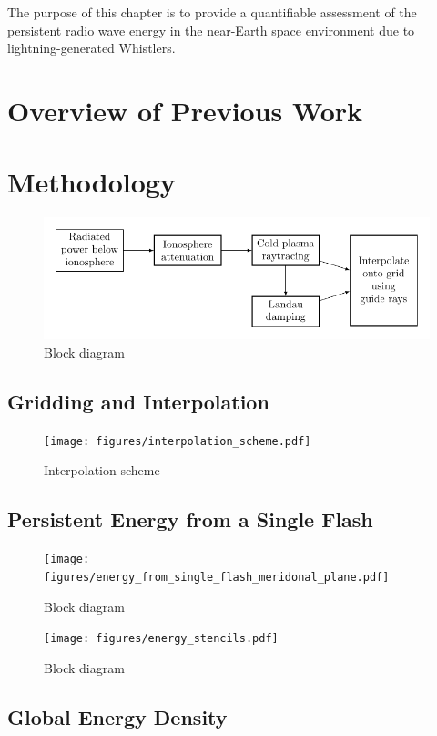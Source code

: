 The purpose of this chapter is to provide a quantifiable assessment of the persistent radio wave energy in the near-Earth space environment due to lightning-generated Whistlers.



\section{Overview of Previous Work}

\section{Methodology}

\begin{figure}[ht]
\begin{center}
\includegraphics{figures/lightning_power_block_diagram.pdf}



\caption{Block diagram}
\label{fig:power_blockdiagram}
\end{center}
\end{figure}

\subsection{Gridding and Interpolation}

\begin{figure}[ht]
\begin{center}
\texttt{[image: figures/interpolation\_scheme.pdf]}
\caption{Interpolation scheme}
\label{fig:interpolation_scheme}
\end{center}
\end{figure}

\subsection{Persistent Energy from a Single Flash}

\begin{figure}[ht]
\begin{center}
\texttt{[image: figures/energy\_from\_single\_flash\_meridonal\_plane.pdf]}
\caption{Block diagram}
\label{fig:energy_from_single_flash}
\end{center}
\end{figure}


\begin{figure}[ht]
\begin{center}
\texttt{[image: figures/energy\_stencils.pdf]}
\caption{Block diagram}
\label{fig:energy_stencils}
\end{center}
\end{figure}

\subsection{Global Energy Density}